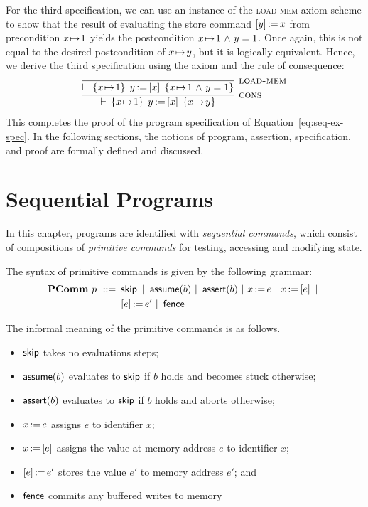 \documentclass[11pt]{report}
\begin{document}
For the third specification, we can use an instance of the \textsc{load-mem} axiom scheme to show that the result of evaluating the store command $\left[ y \right] \operatorname{:\!=} x$ from precondition $x \!\mapsto\! 1$ yields the postcondition $x \!\mapsto\! 1 \operatorname{\,\wedge\,} y = 1$. Once again, this is not equal to the desired postcondition of $x \!\mapsto\! y$, but it is logically equivalent. Hence, we derive the third specification using the axiom and the rule of consequence: 
\[ 
  \infer[\textsc{cons}]{\triple{x \fpointsto 1}{\cload{y}{x}}{x \fpointsto y}}{\infer[\textsc{load-mem}]{\triple{x \fpointsto 1}{\cload{y}{x}}{x \fpointsto 1 \conj y = 1}}{}}
\]
This completes the proof of the program specification of Equation~\ref{eq:seq-ex-spec}. In the following sections, the notions of program, assertion, specification, and proof are formally defined and discussed. 


\section{Sequential Programs}
\label{sec:sequential-programs}

In this chapter, programs are identified with \emph{sequential commands}, which consist of compositions of \emph{primitive commands} for testing, accessing and modifying state. 

The syntax of primitive commands is given by the following grammar: \begin{align*} \mathbf{PComm}~p ~::=~ & \operatorname{\mathsf{skip}} ~|~ \operatorname{\mathsf{assume}}(b) ~|~ \operatorname{\mathsf{assert}}(b) ~|~ x \operatorname{:\!=} e ~|~ x \operatorname{:\!=} \left[ e \right] ~|~ \\ 
    & \left[ e \right] \operatorname{:\!=} e' ~|~ \operatorname{\mathsf{fence}}
\end{align*}

The informal meaning of the primitive commands is as follows. \begin{itemize}
    \item $\operatorname{\mathsf{skip}}$ takes no evaluations steps;
    \item $\operatorname{\mathsf{assume}}(b)$ evaluates to $\operatorname{\mathsf{skip}}$ if $b$ holds and becomes stuck otherwise; 
    \item $\operatorname{\mathsf{assert}}(b)$ evaluates to $\operatorname{\mathsf{skip}}$ if $b$ holds and aborts otherwise;
    \item $x \operatorname{:\!=} e$ assigns $e$ to identifier $x$; 
    \item $x \operatorname{:\!=} \left[ e \right]$ assigns the value at memory address $e$ to identifier $x$; 
    \item $\left[ e \right] \operatorname{:\!=} e'$ stores the value $e'$ to memory address $e'$; and
    \item $\operatorname{\mathsf{fence}}$ commits any buffered writes to memory 
\end{itemize}
\end{document}

